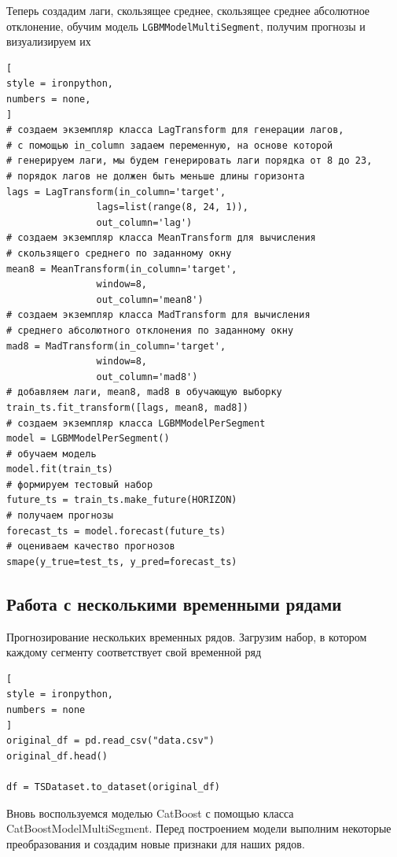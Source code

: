 \documentclass[%
	11pt,
	a4paper,
	utf8,
		]{article}
\begin{document}
Теперь создадим лаги, скользящее среднее, скользящее среднее абсолютное отклонение, обучим модель \texttt{LGBMModelMultiSegment}, получим прогнозы и визуализируем их
\begin{lstlisting}[
style = ironpython,
numbers = none,
]
# создаем экземпляр класса LagTransform для генерации лагов,
# с помощью in_column задаем переменную, на основе которой
# генерируем лаги, мы будем генерировать лаги порядка от 8 до 23, 
# порядок лагов не должен быть меньше длины горизонта
lags = LagTransform(in_column='target', 
				lags=list(range(8, 24, 1)), 
				out_column='lag')
# создаем экземпляр класса MeanTransform для вычисления 
# скользящего среднего по заданному окну
mean8 = MeanTransform(in_column='target', 
				window=8, 
				out_column='mean8')
# создаем экземпляр класса MadTransform для вычисления 
# среднего абсолютного отклонения по заданному окну
mad8 = MadTransform(in_column='target',
				window=8, 
				out_column='mad8')
# добавляем лаги, mean8, mad8 в обучающую выборку
train_ts.fit_transform([lags, mean8, mad8])
# создаем экземпляр класса LGBMModelPerSegment
model = LGBMModelPerSegment()
# обучаем модель
model.fit(train_ts)
# формируем тестовый набор
future_ts = train_ts.make_future(HORIZON)
# получаем прогнозы
forecast_ts = model.forecast(future_ts)
# оцениваем качество прогнозов
smape(y_true=test_ts, y_pred=forecast_ts)
\end{lstlisting}

\subsection{Работа с несколькими временными рядами}

Прогнозирование нескольких временных рядов. Загрузим набор, в котором каждому сегменту соответствует свой временной ряд
\begin{lstlisting}[
style = ironpython,
numbers = none	
]
original_df = pd.read_csv("data.csv")
original_df.head()

df = TSDataset.to_dataset(original_df)
\end{lstlisting}

Вновь воспользуемся моделью CatBoost с помощью класса CatBoostModelMultiSegment. Перед построением модели выполним некоторые преобразования и создадим новые признаки для наших рядов.
\end{document}
